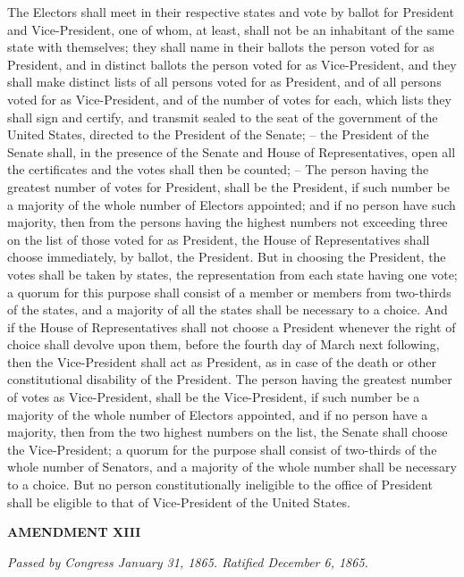 The Electors shall meet in their respective states and vote by ballot for President and Vice-President, one of whom, at least, shall not be an inhabitant of the same state with themselves; they shall name in their ballots the person voted for as President, and in distinct ballots the person voted for as Vice-President, and they shall make distinct lists of all persons voted for as President, and of all persons voted for as Vice-President, and of the number of votes for each, which lists they shall sign and certify, and transmit sealed to the seat of the government of the United States, directed to the President of the Senate; -- the President of the Senate shall, in the presence of the Senate and House of Representatives, open all the certificates and the votes shall then be counted; -- The person having the greatest number of votes for President, shall be the President, if such number be a majority of the whole number of Electors appointed; and if no person have such majority, then from the persons having the highest numbers not exceeding three on the list of those voted for as President, the House of Representatives shall choose immediately, by ballot, the President. But in choosing the President, the votes shall be taken by states, the representation from each state having one vote; a quorum for this purpose shall consist of a member or members from two-thirds of the states, and a majority of all the states shall be necessary to a choice. And if the House of Representatives shall not choose a President whenever the right of choice shall devolve upon them, before the fourth day of March next following, then the Vice-President shall act as President, as in case of the death or other constitutional disability of the President. The person having the greatest number of votes as Vice-President, shall be the Vice-President, if such number be a majority of the whole number of Electors appointed, and if no person have a majority, then from the two highest numbers on the list, the Senate shall choose the Vice-President; a quorum for the purpose shall consist of two-thirds of the whole number of Senators, and a majority of the whole number shall be necessary to a choice. But no person constitutionally ineligible to the office of President shall be eligible to that of Vice-President of the United States.

\begin{center} 
\textbf{AMENDMENT XIII}
\end{center} 

\textit{Passed by Congress January 31, 1865. Ratified December 6, 1865.}

